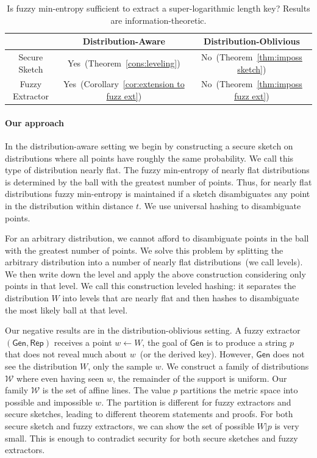 \documentclass[11pt]{article}
\newcommand{\thref}[1]{\mbox{Theorem~\ref{#1}}}
\newcommand{\corref}[1]{\mbox{Corollary~\ref{#1}}}
\newcommand{\class}[1]{{\ensuremath{\mathsf{#1}}}}
\newcommand{\gen}{\ensuremath{\class{Gen}}\xspace}
\newcommand{\rep}{\ensuremath{\class{Rep}}\xspace}
\begin{document}
\begin{table}
\begin{center}
\begin{tabular}{c | c | c }
 & Distribution-Aware & Distribution-Oblivious\\
\hline
Secure Sketch & Yes~(\thref{cons:leveling}) & No~(\thref{thm:imposs sketch})\\
\hline
Fuzzy Extractor & Yes~(\corref{cor:extension to fuzz ext}) & No~(\thref{thm:imposs fuzz ext}) 
\end{tabular}
\end{center}
\caption{Is fuzzy min-entropy sufficient to extract a super-logarithmic length key?  Results are information-theoretic.}
\label{tab:main results}
\end{table}
\paragraph{Our approach} In the distribution-aware setting we begin by constructing a secure sketch on distributions where all points have roughly the same probability.  We call this type of distribution nearly flat.  The fuzzy min-entropy of nearly flat distributions is determined by the ball with the greatest number of points.  Thus, for nearly flat distributions fuzzy min-entropy is maintained if a sketch disambiguates any point in the distribution within distance $t$.  We use universal hashing to disambiguate points.

For an arbitrary distribution, we cannot afford to disambiguate points in the ball with the greatest number of points.  We solve this problem by splitting the arbitrary distribution into a number of nearly flat distributions~(we call levels).  We then write down the level and apply the above construction considering only points in that level.  We call this construction leveled hashing: it separates the distribution $W$ into levels that are nearly flat and then hashes to disambiguate the most likely ball at that level.

Our negative results are in the distribution-oblivious setting.  A fuzzy extractor $(\gen, \rep)$ receives a point $w\leftarrow W$, the goal of $\gen$ is to produce a string $p$ that does not reveal much about $w$~(or the derived key).  However, $\gen$ does not see the distribution $W$, only the sample $w$.  We construct a family of distributions $\mathcal{W}$ where even having seen $w$, the remainder of the support is uniform.  Our family $\mathcal{W}$ is the set of affine lines.  The value  $p$ partitions the metric space into possible and impossible $w$.  The partition is different for fuzzy extractors and secure sketches, leading to different theorem statements and proofs.  For both secure sketch and fuzzy extractors, we can show the set of possible $W|p$ is very small.  This is enough to contradict security for both secure sketches and fuzzy extractors.
\end{document}
